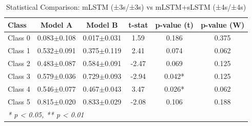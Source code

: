 \begin{table}[htbp]
\centering
\caption{Statistical Comparison: mLSTM (±3s/±3s) vs mLSTM+sLSTM (±4s/±4s)}
\label{tab:comparison_class_mlstm_±3s_±3s_vs_mlstmslstm_±4s_±4s}
\begin{tabular}{lccccc}
\toprule
\textbf{Class} & \textbf{Model A} & \textbf{Model B} & \textbf{t-stat} & \textbf{p-value (t)} & \textbf{p-value (W)} \\
\midrule
Class 0 & 0.083$\pm$0.108 & 0.017$\pm$0.031 & 1.59 & 0.186 & 0.375 \\
Class 1 & 0.532$\pm$0.091 & 0.375$\pm$0.119 & 2.41 & 0.074 & 0.062 \\
Class 2 & 0.483$\pm$0.087 & 0.584$\pm$0.091 & -2.47 & 0.069 & 0.125 \\
Class 3 & 0.579$\pm$0.036 & 0.729$\pm$0.093 & -2.94 & 0.042* & 0.125 \\
Class 4 & 0.546$\pm$0.077 & 0.467$\pm$0.043 & 3.47 & 0.026* & 0.062 \\
Class 5 & 0.815$\pm$0.020 & 0.833$\pm$0.029 & -2.08 & 0.106 & 0.188 \\
\bottomrule
\multicolumn{6}{l}{\textit{* p < 0.05, ** p < 0.01}} \\
\end{tabular}
\end{table}